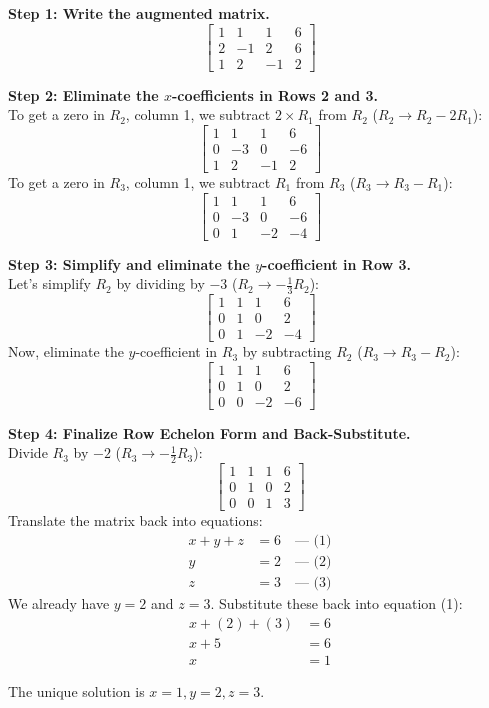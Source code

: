 \begin{solution}
\textbf{Step 1: Write the augmented matrix.}
\[
\left[ \begin{array}{ccc|c} 
1 & 1 & 1 & 6 \\ 
2 & -1 & 2 & 6 \\ 
1 & 2 & -1 & 2 
\end{array} \right]
\]

\medskip
\textbf{Step 2: Eliminate the $x$-coefficients in Rows 2 and 3.} \\
To get a zero in $R_2$, column 1, we subtract $2 \times R_1$ from $R_2$ ($R_2 \to R_2 - 2R_1$):
\[
\left[ \begin{array}{ccc|c} 
1 & 1 & 1 & 6 \\ 
0 & -3 & 0 & -6 \\ 
1 & 2 & -1 & 2 
\end{array} \right]
\]
To get a zero in $R_3$, column 1, we subtract $R_1$ from $R_3$ ($R_3 \to R_3 - R_1$):
\[
\left[ \begin{array}{ccc|c} 
1 & 1 & 1 & 6 \\ 
0 & -3 & 0 & -6 \\ 
0 & 1 & -2 & -4 
\end{array} \right]
\]

\medskip
\textbf{Step 3: Simplify and eliminate the $y$-coefficient in Row 3.} \\
Let's simplify $R_2$ by dividing by $-3$ ($R_2 \to -\frac{1}{3}R_2$):
\[
\left[ \begin{array}{ccc|c} 
1 & 1 & 1 & 6 \\ 
0 & 1 & 0 & 2 \\ 
0 & 1 & -2 & -4 
\end{array} \right]
\]
Now, eliminate the $y$-coefficient in $R_3$ by subtracting $R_2$ ($R_3 \to R_3 - R_2$):
\[
\left[ \begin{array}{ccc|c} 
1 & 1 & 1 & 6 \\ 
0 & 1 & 0 & 2 \\ 
0 & 0 & -2 & -6 
\end{array} \right]
\]

\medskip
\textbf{Step 4: Finalize Row Echelon Form and Back-Substitute.} \\
Divide $R_3$ by $-2$ ($R_3 \to -\frac{1}{2}R_3$):
\[
\left[ \begin{array}{ccc|c} 
1 & 1 & 1 & 6 \\ 
0 & 1 & 0 & 2 \\ 
0 & 0 & 1 & 3 
\end{array} \right]
\]
Translate the matrix back into equations:
\begin{align*}
x + y + z &= 6 \quad \text{--- (1)} \\
y &= 2 \quad \text{--- (2)} \\
z &= 3 \quad \text{--- (3)}
\end{align*}
We already have $y=2$ and $z=3$. Substitute these back into equation (1):
\begin{align*}
x + (2) + (3) &= 6 \\
x + 5 &= 6 \\
x &= 1
\end{align*}

The unique solution is $x = 1, y = 2, z = 3$.
\end{solution}

